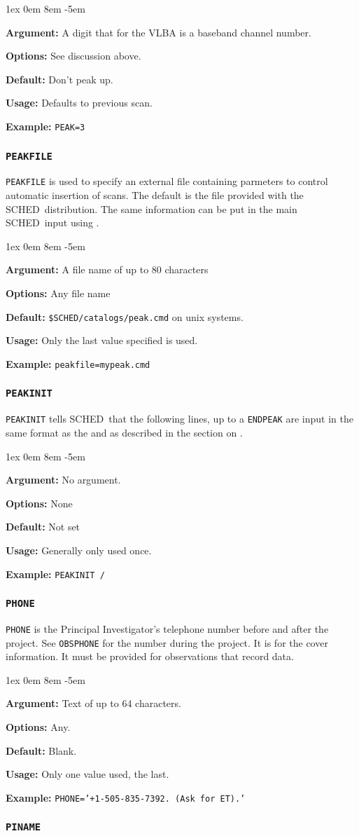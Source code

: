 \documentclass{report}
\newcommand{\schedb}{{\sc SCHED~}}
\newcommand{\rcwbox}[5]{
  \begin{list}{}{\parsep 1ex  \itemsep 0em
                 \leftmargin 8em  \itemindent -5em }
    \item {\bf Argument:} #1
    \item {\bf Options:}  #2
    \item {\bf Default:}  #3
    \item {\bf Usage:}    #4
    \item {\bf Example:}  #5
  \end{list}
}
\begin{document}
\rcwbox
{A digit that for the VLBA is a baseband channel number.}
{See discussion above.}
{Don't peak up.}
{Defaults to previous scan.}
{{\tt PEAK=3}}


\subsubsection{\label{MP:PEAKFILE}{\tt PEAKFILE}}

{\tt PEAKFILE} is used to specify an external file containing
parmeters to control automatic insertion of  scans.  The default is the file provided
with the \schedb distribution.  The same information can be put
in the main \schedb input using .

\rcwbox
{A file name of up to 80 characters}
{Any file name}
{{\tt \$SCHED/catalogs/peak.cmd} on unix systems.}
{Only the last value specified is used.}
{{\tt peakfile=mypeak.cmd}}


\subsubsection{\label{MP:PEAKINIT}{\tt PEAKINIT}}

{\tt PEAKINIT} tells \schedb that the following lines, up to a
{\tt ENDPEAK} are input in the same format as the
 and as described in the section on
.

\rcwbox
{No argument.}
{None}
{Not set}
{Generally only used once.}
{{\tt PEAKINIT /}}


\subsubsection{\label{MP:PHONE}{\tt PHONE}}

{\tt PHONE} is the  Principal Investigator's telephone number before
and after the project. See {\tt OBSPHONE} for the number during the
project.  It is for the cover information.  It must be provided for
observations that record data.

\rcwbox
{Text of up to 64 characters.}
{Any.}
{Blank.}
{Only one value used, the last.}
{{\tt PHONE='+1-505-835-7392. (Ask for ET).'}}


\subsubsection{\label{MP:PINAME}{\tt PINAME}}
\end{document}
